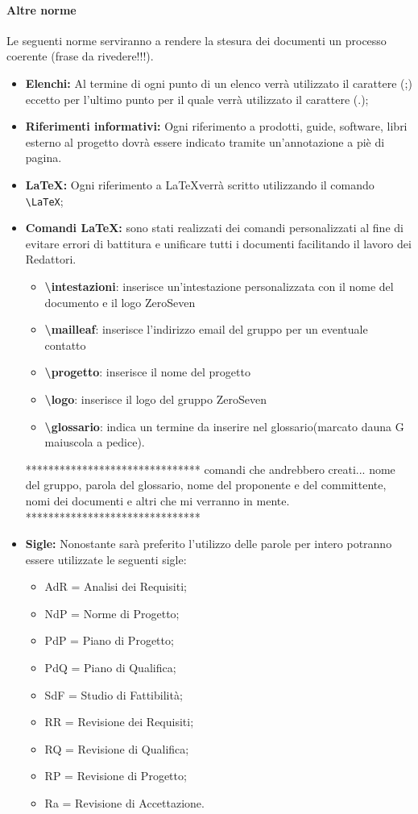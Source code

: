 \paragraph{Altre norme} 
Le seguenti norme serviranno a rendere la stesura dei documenti un processo coerente (frase da rivedere!!!).
\begin{itemize}
	\item \textbf{Elenchi:} Al termine di ogni punto di un elenco verrà utilizzato il carattere (;) eccetto per l'ultimo punto per il quale verrà utilizzato il carattere (.);
	\item \textbf{Riferimenti informativi:} Ogni riferimento a prodotti, guide, software,
	libri esterno al progetto dovrà essere indicato tramite un’annotazione a piè di
	pagina.
	\item \textbf{\LaTeX:} Ogni riferimento a \LaTeX verrà scritto utilizzando il comando \texttt{\textbackslash LaTeX};
	\item \textbf{Comandi \LaTeX:} sono stati realizzati dei comandi personalizzati al fine di evitare errori di battitura e unificare tutti i documenti facilitando il lavoro dei Redattori.
	\begin{itemize}
		\item \textbf{ \textbackslash intestazioni}: inserisce un'intestazione personalizzata con il nome del documento e il logo ZeroSeven
		\item \textbf{ \textbackslash mailleaf}: inserisce l'indirizzo email del gruppo per un eventuale contatto
		\item \textbf{ \textbackslash progetto}: inserisce il nome del progetto
		\item \textbf{ \textbackslash logo}: inserisce il logo del gruppo ZeroSeven
		\item \textbf{ \textbackslash glossario}: indica un termine da inserire nel glossario(marcato dauna G maiuscola a pedice).	
	\end{itemize}
	
	*******************************
	comandi che andrebbero creati... nome del gruppo, parola del glossario, nome del proponente e del committente, nomi dei documenti e altri che mi verranno in mente.
	*******************************
	\item \textbf{Sigle:} Nonostante sarà preferito l'utilizzo delle parole per intero potranno essere utilizzate le seguenti sigle:
	\begin{itemize}
	\item AdR = Analisi dei Requisiti;
	\item NdP = Norme di Progetto;
	\item PdP = Piano di Progetto;
	\item PdQ = Piano di Qualifica;
	\item SdF = Studio di Fattibilità;
	\item RR = Revisione dei Requisiti;
	\item RQ = Revisione di Qualifica;
	\item RP = Revisione di Progetto;
	\item Ra = Revisione di Accettazione.
	\end{itemize}
\end{itemize}

